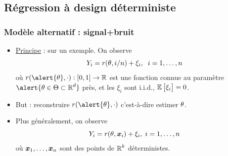 %

\subsection{Régression à design déterministe}


\begin{frame}
\frametitle{Modèle alternatif : signal+bruit}
\begin{itemize}
\item \underline{Principe} : \alert{sur un exemple}. On observe
$$Y_i = r(\theta, i/n)+\xi_i,\;\;i=1,\ldots,n$$
où $r(\alert{\truetheta},\cdot):[0,1]\rightarrow \R$ est une
fonction connue au paramètre $\alert{\truetheta \in \Theta
\subset \R^d}$ près, et les $\xi_i$ sont i.i.d.,
$\operatorname{{\mathbb E}}\big[\xi_i\big]=0$.
\item \alert{ But} : reconstruire $r(\alert{\truetheta},\cdot)$ c'est-à-dire \alert{ estimer $\theta$}.
\item Plus généralement, on observe
$$Y_i = r(\theta, \operatorname{\boldsymbol{x}}_i)+\xi_i,\;i=1,\ldots, n$$
où $\operatorname{\boldsymbol{x}}_1,\ldots, \operatorname{\boldsymbol{x}}_n$ sont des points de $\operatorname{{\mathbb R}}^k$ \alert{
déterministes}.
\end{itemize}
\end{frame}

